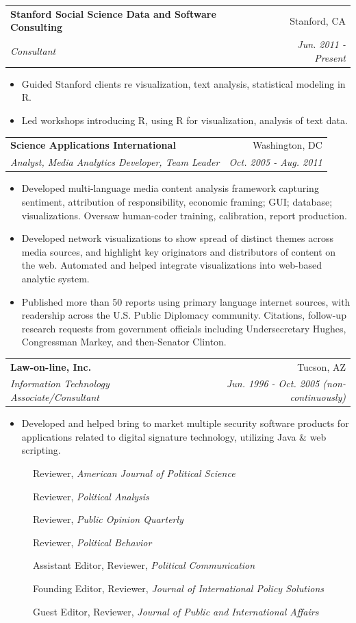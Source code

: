 \documentclass[letterpaper,11pt]{article}
\makeatletter
\newcommand{\resitem}[1]{\item #1 \vspace{-6pt}}
\newcommand{\resheading}[1]{\vspace{4pt}{\large
\colorbox{mygrey}{\begin{minipage}{\textwidth}{\textbf{#1
\vphantom{p\^{E}}}}\end{minipage}}}\vspace{4pt}}
\newcommand{\ressubheading}[4]{\vspace{2pt}
\begin{tabular*}{7.58in}{l@{\extracolsep{\fill}}r}
		\textbf{#1} & #2 \\
		\textit{#3} & \textit{#4} \\
\end{tabular*}\vspace{-7pt}}
\makeatother
\begin{document}
	\ressubheading{Stanford Social Science Data and Software Consulting}{Stanford, CA}{Consultant}{Jun. 2011 - Present}
	\begin{itemize}
		\resitem{Guided Stanford clients re visualization, text analysis, statistical modeling in R.}
		\resitem{Led workshops introducing R, using R for visualization, analysis of text data.} 
	\end{itemize}

\ressubheading{Science Applications International}{Washington, DC}{Analyst, Media Analytics Developer, Team Leader}{Oct. 2005 - Aug. 2011}
\begin{itemize}
\resitem{Developed multi-language media content analysis framework capturing sentiment, attribution of responsibility, economic framing; GUI; database; visualizations.  Oversaw human-coder training, calibration, report production.}
\resitem{Developed network visualizations to show spread of distinct themes across media sources, and highlight key originators and distributors of content on the web.  Automated and helped integrate visualizations into web-based analytic system.}
\resitem{Published more than 50 reports using primary language internet sources, with readership across the U.S. Public Diplomacy community. Citations, follow-up research requests from government officials including Undersecretary Hughes, Congressman Markey, and then-Senator Clinton.}
\end{itemize} 

\ressubheading{Law-on-line, Inc.}{Tucson, AZ}{Information Technology Associate/Consultant}
{Jun. 1996 - Oct. 2005 (non-continuously)}
\begin{itemize}
\resitem{Developed and helped bring to market multiple security software products for 
applications related to digital signature technology, utilizing Java \& web scripting.}
\end{itemize}

\resheading{Journal Service}
\begin{description}
\item[] Reviewer, \emph{American Journal of Political Science}
\item[] Reviewer, \emph{Political Analysis}
\item[] Reviewer, \emph{Public Opinion Quarterly}
\item[] Reviewer, \emph{Political Behavior}
\item[] Assistant Editor, Reviewer, \emph{Political Communication}
\item[] Founding Editor, Reviewer, \emph{Journal of International Policy Solutions}
\item[] Guest Editor, Reviewer, \emph{Journal of Public and International Affairs}
\end{description}
\end{document}
